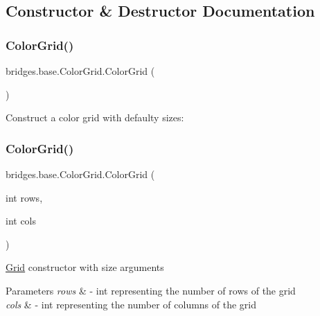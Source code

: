 \subsection{Constructor \& Destructor Documentation}
\mbox{\label{classbridges_1_1base_1_1_color_grid_af434a5a3dcbaf86e51ac6f9e1c1d7e5f}} 
\subsubsection{\texorpdfstring{Color\+Grid()}{ColorGrid()}\hspace{0.1cm}{\footnotesize\ttfamily [1/3]}}
{\footnotesize\ttfamily bridges.\+base.\+Color\+Grid.\+Color\+Grid (\begin{DoxyParamCaption}{ }\end{DoxyParamCaption})}

Construct a color grid with defaulty sizes\+: \mbox{\label{classbridges_1_1base_1_1_color_grid_aafb4157a4c8129f30c1f989fcdfda544}} 
\subsubsection{\texorpdfstring{Color\+Grid()}{ColorGrid()}\hspace{0.1cm}{\footnotesize\ttfamily [2/3]}}
{\footnotesize\ttfamily bridges.\+base.\+Color\+Grid.\+Color\+Grid (\begin{DoxyParamCaption}\item[{int}]{rows,  }\item[{int}]{cols }\end{DoxyParamCaption})}

\mbox{\hyperlink{classbridges_1_1base_1_1_grid}{Grid}} constructor with size arguments


\begin{DoxyParams}{Parameters}
{\em rows} & -\/ int representing the number of rows of the grid \\
\hline
{\em cols} & -\/ int representing the number of columns of the grid \\
\hline
\end{DoxyParams}
\mbox{\label{classbridges_1_1base_1_1_color_grid_aef40242c93b66ab851e6afa64cada0b5}} 
